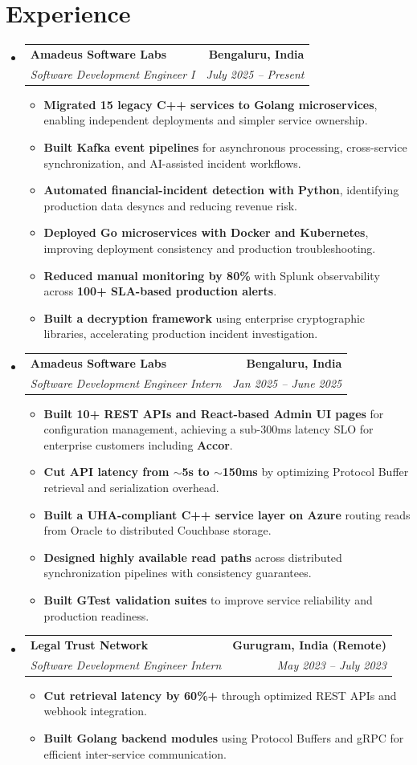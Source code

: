 \documentclass[letterpaper,11pt]{article}
\makeatletter
\newlength{\resumeWidth}
\newcommand{\resumeItem}[1]{\item\small{#1\vspace{-1pt}}}
\newcommand{\resumeSubheading}[4]{
  \vspace{-2pt}\item
  \begin{tabular*}{\resumeWidth}[t]{l@{\extracolsep{\fill}}r}
    \textbf{#1} & #2 \\
    \textit{\small#3} & \textit{\small#4} \\
  \end{tabular*}\vspace{-7pt}
}
\newcommand{\resumeItemListStart}{\begin{itemize}}
\newcommand{\resumeItemListEnd}{\end{itemize}\vspace{-6pt}}
\newcommand{\resumeSubHeadingListStart}{\begin{itemize}[leftmargin=-0.1in,label={}]}
\newcommand{\resumeSubHeadingListEnd}{\end{itemize}}
\makeatother
\begin{document}
\section{Experience}
\resumeSubHeadingListStart
\resumeSubheading{Amadeus Software Labs}{\textbf{Bengaluru, India}}
  {Software Development Engineer I}{July 2025 -- Present}
\resumeItemListStart
\resumeItem{\textbf{Migrated 15 legacy C++ services to Golang microservices}, enabling independent deployments and simpler service ownership.}
\resumeItem{\textbf{Built Kafka event pipelines} for asynchronous processing, cross-service synchronization, and AI-assisted incident workflows.}
\resumeItem{\textbf{Automated financial-incident detection with Python}, identifying production data desyncs and reducing revenue risk.}
\resumeItem{\textbf{Deployed Go microservices with Docker and Kubernetes}, improving deployment consistency and production troubleshooting.}
\resumeItem{\textbf{Reduced manual monitoring by 80\%} with Splunk observability across \textbf{100+ SLA-based production alerts}.}
\resumeItem{\textbf{Built a decryption framework} using enterprise cryptographic libraries, accelerating production incident investigation.}
\resumeItemListEnd
\resumeSubheading{Amadeus Software Labs}{\textbf{Bengaluru, India}}
  {Software Development Engineer Intern}{Jan 2025 -- June 2025}
\resumeItemListStart
\resumeItem{\textbf{Built 10+ REST APIs and React-based Admin UI pages} for configuration management, achieving a sub-300ms latency SLO for enterprise customers including \textbf{Accor}.}
\resumeItem{\textbf{Cut API latency from $\sim$5s to $\sim$150ms} by optimizing Protocol Buffer retrieval and serialization overhead.}
\resumeItem{\textbf{Built a UHA-compliant C++ service layer on Azure} routing reads from Oracle to distributed Couchbase storage.}
\resumeItem{\textbf{Designed highly available read paths} across distributed synchronization pipelines with consistency guarantees.}
\resumeItem{\textbf{Built GTest validation suites} to improve service reliability and production readiness.}
\resumeItemListEnd
\resumeSubheading{Legal Trust Network}{\textbf{Gurugram, India (Remote)}}
  {Software Development Engineer Intern}{May 2023 -- July 2023}
\resumeItemListStart
\resumeItem{\textbf{Cut retrieval latency by 60\%+} through optimized REST APIs and webhook integration.}
\resumeItem{\textbf{Built Golang backend modules} using Protocol Buffers and gRPC for efficient inter-service communication.}
\resumeItemListEnd
\resumeSubHeadingListEnd
\end{document}
